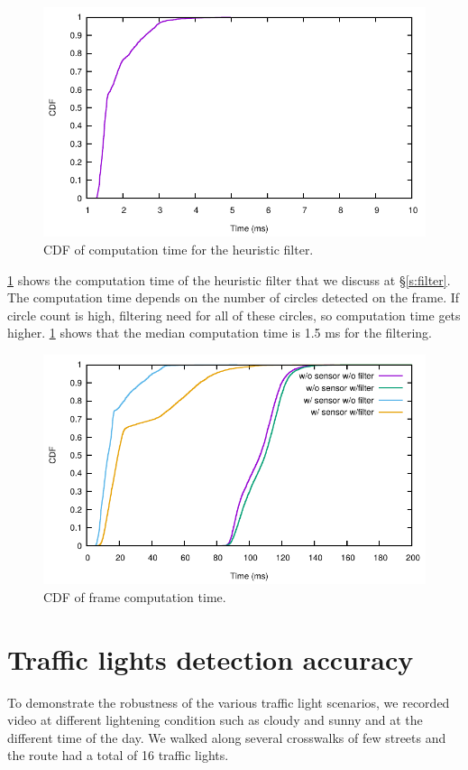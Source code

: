 \begin{figure}[h!]
\centering
\includegraphics[width=5.2in]{plots/sunny_cdf_filter.pdf}
\caption{CDF of computation time for the heuristic filter.}
\label{f:cdf_fil}
\end{figure}

\ref{f:cdf_fil} shows the computation time of the heuristic filter that we discuss at \S\ref{s:filter}.
The computation time depends on the number of circles detected on the frame.
If circle count is high, filtering need for all of these circles, so computation time gets higher.
\ref{f:cdf_fil} shows that the median computation time is 1.5 ms for the filtering. 


\begin{figure}[h!]
\centering
\includegraphics[width=5.2in]{plots/walk_cdf_time.pdf}
\caption{CDF of frame computation time.}
\label{f:cdf_time}
\end{figure}



\section{Traffic lights detection accuracy}
\label{s:acc}
To demonstrate the robustness of the various traffic light scenarios, we recorded video at different lightening condition such as cloudy and sunny and at the different time of the day.
We walked along several crosswalks of few streets and the route had a total of 16 traffic lights.

